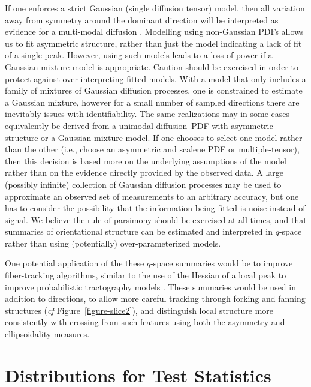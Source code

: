 \documentclass[dvips,aoas,preprint]{imsart}
\numberwithin{equation}{section}
\theoremstyle{plain}
\begin{document}
If one enforces a strict Gaussian (single diffusion tensor) model,
then all variation away from symmetry around the dominant direction
will be interpreted as evidence for a multi-modal diffusion
\citep{par-ale:pico,hos-wil-ans:inference,Behrens2007}.
Modelling using non-Gaussian PDFs allows us to fit asymmetric
structure, rather than just the model indicating a lack of fit of a
single peak. However, using such models leads to a loss of power if a
Gaussian mixture model is appropriate.  Caution should be exercised in
order to protect against over-interpreting fitted models.  With a
model that only includes a family of mixtures of Gaussian diffusion
processes, one is constrained to estimate a Gaussian mixture, however
for a small number of sampled directions there are inevitably issues
with identifiability.  The same realizations may in some cases
equivalently be derived from a unimodal diffusion~PDF with asymmetric
structure or a Gaussian mixture model.  If one chooses to select one
model rather than the other (i.e., choose an asymmetric and scalene
PDF or multiple-tensor), then this decision is based more on the
underlying assumptions of the model rather than on the evidence
directly provided by the observed data.  A large (possibly infinite)
collection of Gaussian diffusion processes may be used to approximate
an observed set of measurements to an arbitrary accuracy, but one has
to consider the possibility that the information being fitted is noise
instead of signal.  We believe the rule of parsimony should be
exercised at all times, and that summaries of orientational structure
can be estimated and interpreted in $q$-space rather than using
(potentially) over-parameterized models.

One potential application of the these $q$-space summaries would be to
improve fiber-tracking algorithms, similar to the use of the Hessian
of a local peak to improve probabilistic tractography models
\citep{Seunarine}.  These summaries would be used in addition to
directions, to allow more careful tracking through forking and fanning
structures ({\em cf} Figure~\ref{figure-slice2}), and distinguish
local structure more consistently with crossing from such features
using both the asymmetry and ellipsoidality measures.

\appendix

\section{Distributions for Test Statistics}
\end{document}
